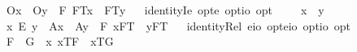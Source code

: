 \begin{isabellebody}
\ \ \ \ {\isasymlparr}O{\isacharbang}{\isacharcomma}x{\isasymrparr}\ \isactrlbold {\isasymand}\ {\isasymlparr}O{\isacharbang}{\isacharcomma}y{\isasymrparr}\ \isactrlbold {\isasymand}\ \isactrlbold {\isasymbox}{\isacharparenleft}\isactrlbold {\isasymforall}F{\isachardot}\ {\isasymlparr}F\isactrlsup T{\isacharcomma}x{\isasymrparr}\ \isactrlbold {\isasymequiv}\ {\isasymlparr}F\isactrlsup T{\isacharcomma}y{\isasymrparr}{\isacharparenright}{\isachardoublequoteclose}\isanewline
\isanewline
\ \isamarkupfalse%
\ identityI{\isacharcolon}{\isacharcolon}{\isachardoublequoteopen}e\ opt{\isasymRightarrow}e\ opt{\isasymRightarrow}io\ opt{\isachardoublequoteclose}\ {\isacharparenleft}\ {\isachardoublequoteopen}\isactrlbold {\isacharequal}{\isachardoublequoteclose}\ {}{}{\isacharparenright}\ \ {\isachardoublequoteopen}x\ \isactrlbold {\isacharequal}\ y\ {\isasymequiv}\ \isanewline
\ \ \ \ x\ \isactrlbold {\isacharequal}\isactrlsub E\ y\ \isactrlbold {\isasymor}\ {\isacharparenleft}{\isasymlparr}A{\isacharbang}{\isacharcomma}x{\isasymrparr}\ \isactrlbold {\isasymand}\ {\isasymlparr}A{\isacharbang}{\isacharcomma}y{\isasymrparr}\ \isactrlbold {\isasymand}\ \isactrlbold {\isasymbox}{\isacharparenleft}\isactrlbold {\isasymforall}F{\isachardot}\ {\isasymlbrace}x{\isacharcomma}F\isactrlsup T{\isasymrbrace}\ \isactrlbold {\isasymequiv}\ {\isasymlbrace}y{\isacharcomma}F\isactrlsup T{\isasymrbrace}{\isacharparenright}{\isacharparenright}{\isachardoublequoteclose}%
\isamarkuptrue%
\ \isamarkupfalse%
\ identityRel{}{\isacharcolon}{\isacharcolon}{\isachardoublequoteopen}\ {\isacharparenleft}{\isacharparenleft}e{\isasymRightarrow}io{\isacharparenright}\ opt{\isacharparenright}{\isasymRightarrow}{\isacharparenleft}{\isacharparenleft}e{\isasymRightarrow}io{\isacharparenright}\ opt{\isacharparenright}{\isasymRightarrow}io\ opt{\isachardoublequoteclose}\ {\isacharparenleft}\ {\isachardoublequoteopen}\isactrlbold {\isacharequal}\ {}{}{\isacharparenright}\ \isanewline
\ \ \ \ {\isachardoublequoteopen}F{}\ \isactrlbold {\isacharequal}\ G{}\ {\isasymequiv}\ \isactrlbold {\isasymbox}{\isacharparenleft}\isactrlbold {\isasymforall}x{\isachardot}\ {\isasymlbrace}x\isactrlsup T{\isacharcomma}F{}{\isasymrbrace}\ \isactrlbold {\isasymequiv}\ {\isasymlbrace}x\isactrlsup T{\isacharcomma}G{}{\isasymrbrace}{\isacharparenright}{\isachardoublequoteclose}\isanewline

\end{isabellebody}
